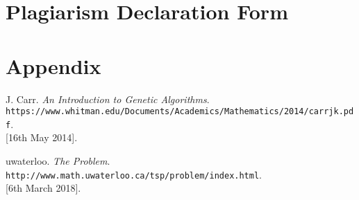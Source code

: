 \documentclass[11pt,a4paper,final]{article}
\begin{document}
	\section{Plagiarism Declaration Form}
	\label{PlagForm}
	
	\section{Appendix}
	\label{Appendix}
	
	\pagebreak
	\begin{thebibliography}{9}
		J. Carr.
		\textit{An Introduction to Genetic Algorithms}.
		\\\texttt{https://www.whitman.edu/Documents/Academics/Mathematics/2014/carrjk.pdf}.
		\\{[16th May 2014]}.
		
		uwaterloo.
		\textit{The Problem}.
		\\\texttt{http://www.math.uwaterloo.ca/tsp/problem/index.html}.
		\\{[6th March 2018]}.
	\end{thebibliography}	
\end{document}

